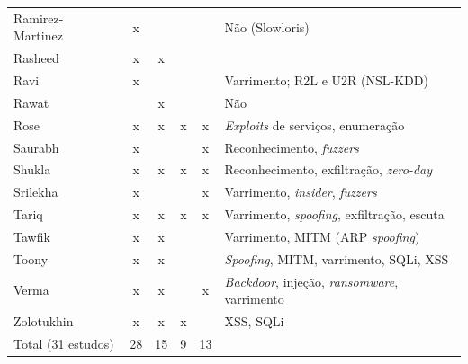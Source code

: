 \documentclass[conference,a4paper]{IEEEtran}
\begin{document}
\begin{table}[p]
\begin{tabular}{@{}>{\raggedright\arraybackslash}p{}cccc>{\raggedright\arraybackslash}p{}@{}}
Ramirez-Martinez~\cite{ramirezmartinez2025p4} & x & & & & Não (Slowloris) \\
Rasheed~\cite{Rasheed2026} & x & x & & & \\
Ravi~\cite{ravi2020semisupervised} & x & & & & Varrimento; R2L e U2R (NSL-KDD) \\
Rawat~\cite{rawat2024intelligent} & & x & & & Não \\
Rose~\cite{rose2022ideres} & x & x & x & x & \textit{Exploits} de serviços, enumeração \\
Saurabh~\cite{saurabh2022mlaps} & x & & & x & Reconhecimento, \textit{fuzzers} \\
Shukla~\cite{shukla2026cyber} & x & x & x & x & Reconhecimento, exfiltração, \textit{zero-day} \\
Srilekha~\cite{srilekha2025hybrid} & x & & & x & Varrimento, \textit{insider}, \textit{fuzzers} \\
Tariq~\cite{tariq2025saegru} & x & x & x & x & Varrimento, \textit{spoofing}, exfiltração, escuta \\
Tawfik~\cite{tawfik2021internet} & x & x & & & Varrimento, MITM (ARP \textit{spoofing}) \\
Toony~\cite{toony2024multiblock} & x & x & & & \textit{Spoofing}, MITM, varrimento, SQLi, XSS \\
Verma~\cite{verma2024petrak} & x & x & & x & \textit{Backdoor}, injeção, \textit{ransomware}, varrimento \\
Zolotukhin~\cite{zolotukhin2021curious} & x & x & x & & XSS, SQLi \\
\midrule
Total (31 estudos) & 28 & 15 & 9 & 13 & \\
\bottomrule
\end{tabular}
\end{table}
\end{document}
